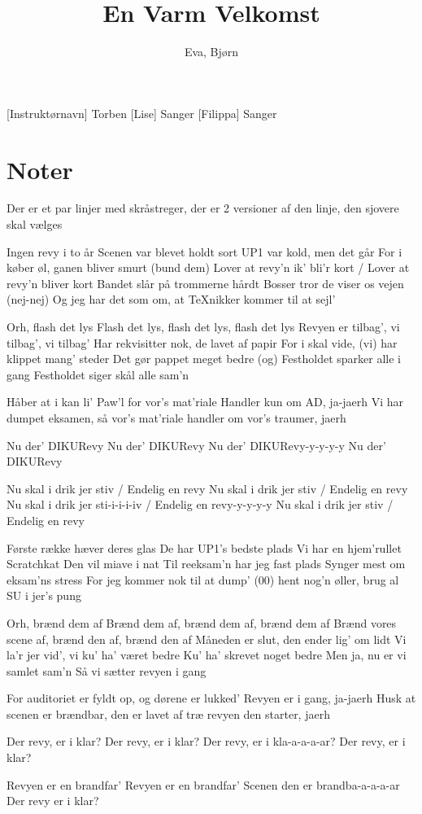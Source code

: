 \documentclass[a4paper,11pt]{article}
\title{En Varm Velkomst}
\author{Eva, Bjørn}
\begin{document}
\maketitle

\begin{roles}
[Instruktørnavn] Torben
[Lise] Sanger
[Filippa] Sanger
\end{roles} 

\begin{props}
\end{props}

\section*{Noter}
Der er et par linjer med skråstreger, der er 2 versioner af den linje, den sjovere skal vælges 


\begin{song}
Ingen revy i to år
Scenen var blevet holdt sort
UP1 var kold, men det går
For i køber øl, ganen bliver smurt (bund dem)
Lover at revy’n ik’ bli’r kort / Lover at revy’n bliver kort
Bandet slår på trommerne hårdt
Bosser tror de viser os vejen (nej-nej)
Og jeg har det som om, at TeXnikker kommer til at sejl’ 

Orh, flash det lys
Flash det lys, flash det lys, flash det lys
Revyen er tilbag’, vi tilbag’, vi tilbag’
Har rekvisitter nok, de lavet af papir
For i skal vide, (vi) har klippet mang’ steder
Det gør pappet meget bedre
(og) Festholdet sparker alle i gang
Festholdet siger skål alle sam’n

Håber at i kan li’ Paw’l for vor’s mat’riale
Handler kun om AD, ja-jaerh
Vi har dumpet eksamen, så vor’s mat’riale
handler om vor’s traumer, jaerh

Nu der’ DIKURevy
Nu der’ DIKURevy
Nu der’ DIKURevy-y-y-y-y 
Nu der’ DIKURevy

Nu skal i drik jer stiv / Endelig en revy
Nu skal i drik jer stiv / Endelig en revy
Nu skal i drik jer sti-i-i-i-iv / Endelig en revy-y-y-y-y
Nu skal i drik jer stiv / Endelig en revy

Første række hæver deres glas
De har UP1’s bedste plads
Vi har en hjem’rullet Scratchkat
Den vil miave i nat
Til reeksam’n har jeg fast plads
Synger mest om eksam’ns stress
For jeg kommer nok til at dump’ (00)
hent nog’n øller, brug al SU i jer’s pung 

Orh, brænd dem af
Brænd dem af, brænd dem af, brænd dem af
Brænd vores scene af, brænd den af, brænd den af
Måneden er slut, den ender lig’ om lidt
Vi la’r jer vid’, vi ku’ ha’ været bedre
Ku’ ha’ skrevet noget bedre
Men ja, nu er vi samlet sam’n
Så vi sætter revyen i gang

For auditoriet er fyldt op, og dørene er lukked’
Revyen er i gang, ja-jaerh 
Husk at scenen er brændbar, den er lavet af træ
revyen den starter, jaerh

Der revy, er i klar?
Der revy, er i klar?
Der revy, er i kla-a-a-a-ar?
Der revy, er i klar?

Revyen er en brandfar’
Revyen er en brandfar’
Scenen den er brandba-a-a-a-ar
Der revy er i klar?


\end{song}
\end{document}
